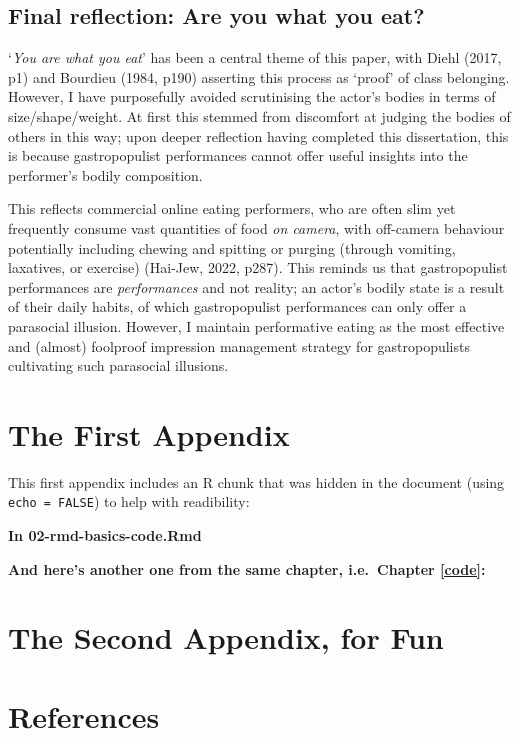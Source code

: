 \documentclass[a4paper, nobind]{templates/ociamthesis}
\newlength{\cslhangindent}
\newenvironment{CSLReferences}[2] %
 {%
  \setlength{\parindent}{0pt}
  \ifodd #1
  \let\oldpar\par
  \def\par{\hangindent=\cslhangindent\oldpar}
  \fi
  \setlength{\parskip}{1mm}
  \setlength{\baselineskip}{6mm}
 }%
 {}
\begin{document}
\hypertarget{final-reflection-are-you-what-you-eat}{%
\section*{Final reflection: Are you what you eat?}\label{final-reflection-are-you-what-you-eat}}

`\emph{You are what you eat}' has been a central theme of this paper, with Diehl (2017, p1) and Bourdieu (1984, p190) asserting this process as `proof' of class belonging. However, I have purposefully avoided scrutinising the actor's bodies in terms of size/shape/weight. At first this stemmed from discomfort at judging the bodies of others in this way; upon deeper reflection having completed this dissertation, this is because gastropopulist performances cannot offer useful insights into the performer's bodily composition.

This reflects commercial online eating performers, who are often slim yet frequently consume vast quantities of food \emph{on camera}, with off-camera behaviour potentially including chewing and spitting or purging (through vomiting, laxatives, or exercise) (Hai-Jew, 2022, p287). This reminds us that gastropopulist performances are \emph{performances} and not reality; an actor's bodily state is a result of their daily habits, of which gastropopulist performances can only offer a parasocial illusion. However, I maintain performative eating as the most effective and (almost) foolproof impression management strategy for gastropopulists cultivating such parasocial illusions.

\startappendices

\hypertarget{the-first-appendix}{%
\chapter{The First Appendix}\label{the-first-appendix}}

This first appendix includes an R chunk that was hidden in the document (using \texttt{echo\ =\ FALSE}) to help with readibility:

\textbf{In 02-rmd-basics-code.Rmd}

\textbf{And here's another one from the same chapter, i.e.~Chapter \ref{code}:}

\hypertarget{the-second-appendix-for-fun}{%
\chapter{The Second Appendix, for Fun}\label{the-second-appendix-for-fun}}

\hypertarget{references}{%
\chapter*{References}\label{references}}


\hypertarget{refs}{}
\begin{CSLReferences}{0}{0}
\end{CSLReferences}

\end{document}
